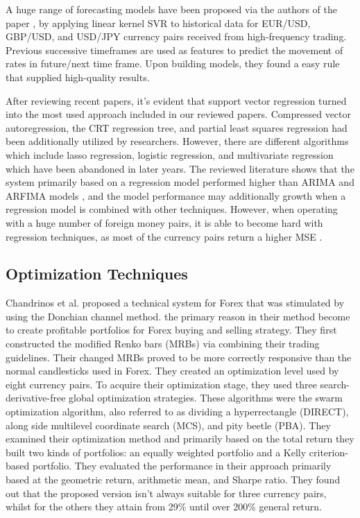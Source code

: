 A huge range of forecasting models have been proposed via the authors of the paper \cite{Serjam18}, by  applying linear kernel SVR to historical data for EUR/USD, GBP/USD, and USD/JPY currency pairs received from high-frequency trading. Previous successive timeframes are used as features to predict the movement of rates in future/next time frame. Upon building models, they found a easy rule that supplied high-quality results.

After reviewing recent papers, it's evident that support vector regression turned into the most used approach included in our reviewed papers. Compressed vector autoregression, the CRT regression tree, and partial least squares regression had been additionally utilized by researchers. However, there are different algorithms which include lasso regression, logistic regression, and multivariate regression which have been abandoned in later years. 
The reviewed literature shows that the system primarily based on a regression model performed higher than ARIMA and ARFIMA models \cite{Raimundo18}, and the model performance may additionally growth \cite{Achchab17} when a regression model is combined with other techniques. However, when operating with a huge number of foreign money pairs, it is able to become hard with regression techniques, as most of the currency pairs return a higher MSE \citep{Taveeapiradeecharoen19}.

\subsection{Optimization Techniques}
Chandrinos et al. \cite{Chandrinos18} proposed a technical system for Forex that was stimulated by using the Donchian channel method. the primary reason in their method become to create profitable portfolios for Forex buying and selling strategy. They first constructed the modified Renko bars (MRBs) via combining their trading guidelines. Their changed MRBs proved to be more correctly responsive than the normal candlesticks used in Forex. They created an optimization level used by eight currency pairs.  To acquire their optimization stage, they used three search-derivative-free global optimization strategies. These algorithms were the swarm optimization algorithm, also referred to as dividing a hyperrectangle (DIRECT), along side multilevel coordinate search (MCS), and pity beetle (PBA). They examined their optimization method and primarily based on the total return they built two kinds of portfolios: an equally weighted portfolio and a Kelly criterion-based portfolio. They evaluated the performance in their approach primarily based at the geometric return, arithmetic mean, and Sharpe ratio. They found out that the proposed version isn't always suitable for three currency pairs, whilst for the others they attain from 29\% until over 200\% general return.

